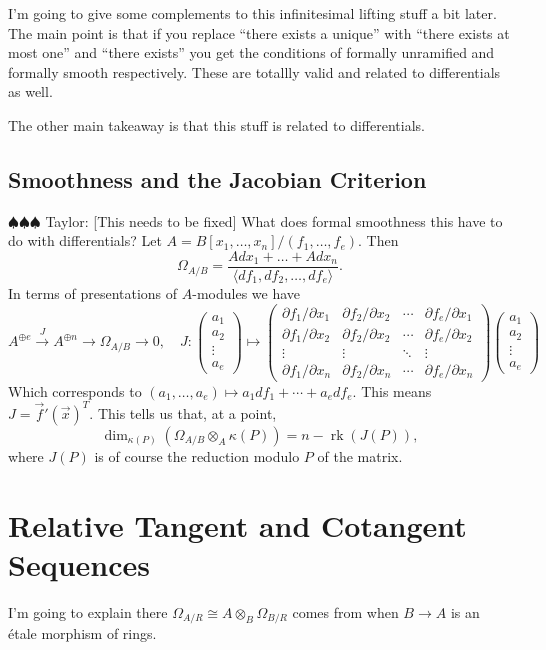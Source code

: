 \documentclass[12pt]{article}
\numberwithin{equation}{section}
\theoremstyle{definition}
\theoremstyle{remark}
\newcommand{\rk}{\operatorname{rk}}
\newcommand{\taylor}[1]{{\color{blue} \sf $\spadesuit\spadesuit\spadesuit$ Taylor: [#1]}}
\begin{document}
I'm going to give some complements to this infinitesimal lifting stuff a bit later.
The main point is that if you replace ``there exists a unique'' with ``there exists at most one'' and ``there exists'' you get the conditions of formally unramified and formally smooth respectively. 
These are totallly valid and related to differentials as well.

The other main takeaway is that this stuff is related to differentials.

\subsection{Smoothness and the Jacobian Criterion}
\taylor{This needs to be fixed}
What does formal smoothness this have to do with differentials?
Let $A = B[x_1,\ldots,x_n]/(f_1,\ldots,f_e)$.
Then 
$$\Omega_{A/B} = \dfrac{A dx_1 + \ldots  + A dx_n}{\langle df_1, df_2,\ldots,df_e \rangle }.$$
In terms of presentations of $A$-modules we have 
$$ A^{\oplus e} \xrightarrow{J} A^{\oplus n} \to \Omega_{A/B} \to 0, \quad J: \begin{pmatrix}
a_1\\
a_2\\
\vdots\\
a_e
\end{pmatrix}
\mapsto 
\begin{pmatrix}
\partial f_1/\partial x_1 & \partial f_2/\partial x_2& \cdots & \partial f_e/\partial x_1\\ 
\partial f_1/\partial x_2 & \partial f_2/\partial x_2 & \cdots & \partial f_e/\partial x_2 \\
\vdots & \vdots & \ddots & \vdots \\
\partial f_1/\partial x_n & \partial f_2/\partial x_n & \cdots & \partial f_e/\partial x_n  
\end{pmatrix}
\begin{pmatrix}
a_1\\
a_2\\
\vdots\\
a_e
\end{pmatrix}
$$
Which corresponds to $(a_1,\ldots,a_e) \mapsto a_1 df_1 + \cdots + a_e df_e$.
This means $J = \vec{f}'(\vec{x})^T$.
This tells us that, at a point, 
$$\dim_{\kappa(P)}(\Omega_{A/B} \otimes_A \kappa(P)) = n - \rk(J(P)),$$ 
where $J(P)$ is of course the reduction modulo $P$ of the matrix. 

\section{Relative Tangent and Cotangent Sequences}
I'm going to explain there $\Omega_{A/R} \cong A\otimes_B \Omega_{B/R}$ comes from when $B\to A$ is an \'{e}tale morphism of rings. 
\end{document}
